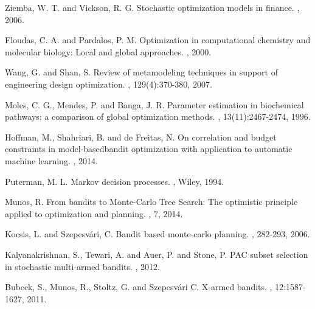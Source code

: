 \documentclass[12pt]{article}
\theoremstyle{plain} \numberwithin{equation}{section}
\theoremstyle{definition}
\begin{document}
\begin{thebibliography}{99}

\newblock Ziemba, W. T. and Vickson, R. G.
\newblock Stochastic optimization models in finance.
, 2006.

\newblock Floudas, C. A. and Pardalos, P. M.
\newblock Optimization in computational chemistry and molecular
biology: Local and global approaches.
, 2000.

\newblock Wang, G. and Shan, S.
\newblock Review of metamodeling techniques in support of engineering
design optimization.
, 129(4):370-380, 2007.

\newblock Moles, C. G., Mendes, P. and Banga, J. R.
\newblock Parameter estimation in biochemical
pathways: a comparison of global optimization methods.
, 13(11):2467-2474, 1996.

\newblock Hoffman, M., Shahriari, B. and de Freitas, N.
\newblock On correlation and budget constraints in model-basedbandit optimization with application to automatic machine learning.
, 2014.

\newblock Puterman, M. L.
\newblock Markov decision processes.
, Wiley, 1994.

\newblock Munos, R.
\newblock From bandits to Monte-Carlo Tree Search: The optimistic principle applied to optimization and planning.
, 7, 2014.

\newblock Kocsis, L. and Szepesv\'ari, C.
\newblock Bandit based monte-carlo planning.
, 282-293, 2006.

\newblock Kalyanakrishnan, S., Tewari, A. and Auer, P. and Stone, P.
\newblock PAC subset selection in stochastic multi-armed bandits.
, 2012.

\newblock Bubeck, S., Munos, R., Stoltz, G. and Szepesv\'ari C.
\newblock X-armed bandits.
, 12:1587-1627, 2011.


\end{thebibliography}
\end{document}
